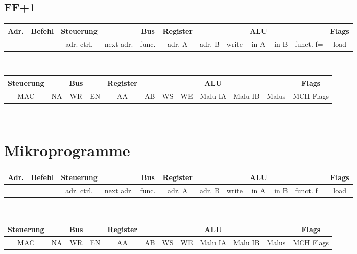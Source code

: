 \documentclass[paper=a4, fontsize=11pt]{scrartcl}
\numberwithin{equation}{section}
\numberwithin{figure}{section}
\numberwithin{table}{section}
\begin{document}

\subsection{FF+1}

\begin{tabular}{|c|c|cc|c|ccc|ccc|c|}
\hline
Adr. & Befehl &Steuerung & & Bus & Register & & & ALU & & & Flags \\
\hline
& & adr. ctrl. & next adr. & func. & adr. A & adr. B & write & in A & in B & funct. f= & load \\
\hline
\end{tabular} \\

\begin{tabular}{|cc|cc|cccc|ccc|c|}
\hline
Steuerung & & Bus & & Register & & & & ALU & & & Flags \\
\hline
MAC & NA & WR & EN & AA & AB & WS & WE & Malu IA & Malu IB & Malus & MCH Flags \\
\hline
\end{tabular} \\


\newpage

\section{Mikroprogramme}

\begin{tabular}{|c|c|cc|c|ccc|ccc|c|}
\hline
Adr. & Befehl &Steuerung & & Bus & Register & & & ALU & & & Flags \\
\hline
& & adr. ctrl. & next adr. & func. & adr. A & adr. B & write & in A & in B & funct. f= & load \\
\hline
\end{tabular} \\

\begin{tabular}{|cc|cc|cccc|ccc|c|}
\hline
Steuerung & & Bus & & Register & & & & ALU & & & Flags \\
\hline
MAC & NA & WR & EN & AA & AB & WS & WE & Malu IA & Malu IB & Malus & MCH Flags \\
\hline
\end{tabular} \\
\end{document}
